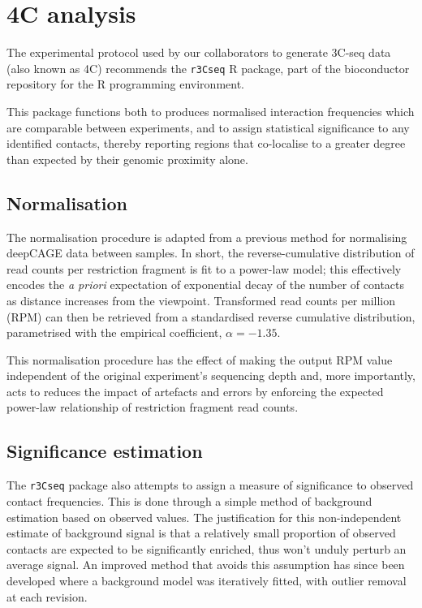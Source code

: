 \documentclass[a4paper,11pt,oneside]{book}
\begin{document}
\section{4C analysis}\label{methods:4c}

The experimental protocol used by our collaborators to generate 3C-seq data (also known as 4C) recommends the \texttt{r3Cseq} R package,\cite{Stadhouders2013, Thongjuea2013} part of the bioconductor repository\cite{Gentleman2004, Huber2015} for the R programming environment.\cite{Ihaka1996}

This package functions both to produces normalised interaction frequencies which are comparable between experiments, and to assign statistical significance to any identified contacts, thereby reporting regions that co-localise to a greater degree than expected by their genomic proximity alone.

\subsection{Normalisation}\label{methods:4cnorm}

The normalisation procedure is adapted from a previous method for normalising deepCAGE data between samples.\cite{Balwierz2009} In short, the reverse-cumulative distribution of read counts per restriction fragment is fit to a power-law model; this effectively encodes the \emph{a priori} expectation of exponential decay of the number of contacts as distance increases from the viewpoint. Transformed read counts per million (RPM) can then be retrieved from a standardised reverse cumulative distribution, parametrised with the empirical coefficient, $\alpha = -1.35$.\cite{Thongjuea2013}

This normalisation procedure has the effect of making the output RPM value independent of the original experiment's sequencing depth and, more importantly, acts to reduces the impact of artefacts and errors by enforcing the expected power-law relationship of restriction fragment read counts.

\subsection{Significance estimation}\label{methods:4csignif}

The \texttt{r3Cseq} package\cite{Thongjuea2013} also attempts to assign a measure of significance to observed contact frequencies. This is done through a simple method of background estimation based on observed values. The justification for this non-independent estimate of background signal is that a relatively small proportion of observed contacts are expected to be significantly enriched, thus won't unduly perturb an average signal.\cite{Thongjuea2013} An improved method that avoids this assumption has since been developed where a background model was iteratively fitted, with outlier removal at each revision.\cite{Ay2014}
\end{document}
